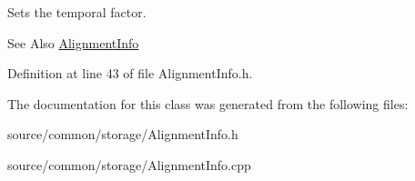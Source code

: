 Sets the temporal factor. 

\begin{DoxySeeAlso}{See Also}
\hyperlink{class_picto_1_1_alignment_info}{Alignment\-Info} 
\end{DoxySeeAlso}


Definition at line 43 of file Alignment\-Info.\-h.



The documentation for this class was generated from the following files\-:\begin{DoxyCompactItemize}
\item 
source/common/storage/Alignment\-Info.\-h\item 
source/common/storage/Alignment\-Info.\-cpp\end{DoxyCompactItemize}
